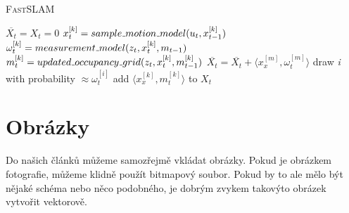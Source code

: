 \documentclass[a4paper, 11pt]{article}
\begin{document}
\begin{algorithm} \label{Algoritmus1}
    \DontPrintSemicolon
    \caption{\textsc{FastSLAM}}
    \SetNlSty{}{}{:}
    
    \BlankLine
    $\overline{X_t} = X_t = 0$ \;
    {
        $x_t^{[k]} = sample\mathunderscore motion\mathunderscore model(u_t, x_{t - 1}^{[k]})$ \;
        $\omega_t^{[k]} = measurement\mathunderscore model(z_t, x_t^{[k]}, m_{t - 1})$ \;
        $m_t^{[k]} = updated\mathunderscore occupancy\mathunderscore grid(z_t, x_t^{[k]}, m_{t - 1}^{[k]})$ \;
        $\overline{X_t} = \overline{X_t} + \langle x_x^{[m]}, \omega_t^{[m]} \rangle$ \;
    }
    {
        draw \emph{i} with probability $\approx \omega_t^{[i]}$ \;
        add $\langle x_x^{[k]}, m_t^{[k]} \rangle$ to $X_t$ \;
    }
     \;
\end{algorithm}

\section{Obrázky}

Do našich článků můžeme samozřejmě vkládat obrázky. Pokud je obrázkem fotografie, můžeme klidně použít bitmapový soubor. Pokud by to ale mělo být nějaké schéma nebo něco podobného, je dobrým zvykem takovýto obrázek vytvořit vektorově.
\end{document}
